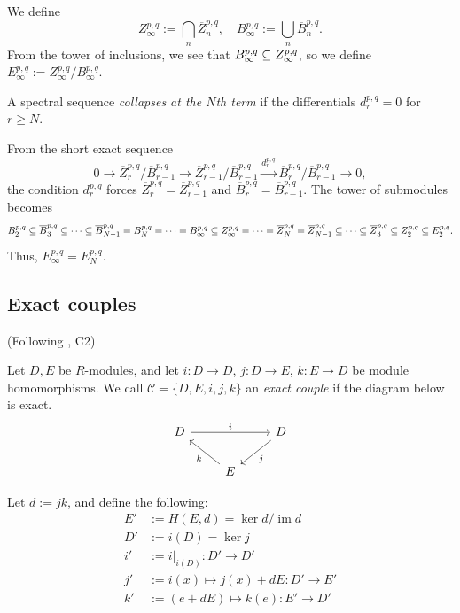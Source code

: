 \documentclass{MetricNotes2023}
\def\subq{\ensuremath\subseteq}
\DeclareMathOperator{\im}{im}
\begin{document}
We define 
\[Z_\infty^{p,q}:= \bigcap_n \overline{Z}^{p,q}_n, \quad B_\infty^{p,q}:=\bigcup_n \overline{B}^{p,q}_n.\]
From the tower of inclusions, we see that \(B_\infty^{p,q}\subq Z^{p,q}_\infty\), so we define \(E_\infty^{p,q}:=Z_\infty^{p,q}/B_\infty^{p,q}\). 

\begin{definition}
A spectral sequence \textit{collapses at the \(N\)th term} if the differentials \(d_r^{p,q}=0\) for \(r\geq N\). 
\end{definition}

From the short exact sequence 
\[0 \to \overline Z^{p,q}_{r}/\overline B_{r-1}^{p,q}\to \overline Z_{r-1}^{p,q}/\overline B_{r-1}^{p,q} \xrightarrow{d_{r}^{p,q}} \overline B_{r}^{p,q}/\overline{B}_{r-1}^{p,q}\to 0,\]
the condition \(d_r^{p,q}\) forces  \(\overline{Z}^{p,q}_r=\overline{Z}_{r-1}^{p,q}\) and \(\overline{B}^{p,q}_r=\overline{B}_{r-1}^{p,q}\). The tower of submodules becomes
\[B_2^{p,q}\subq \overline B_3^{p,q}\subq \cdots \subq \overline B_{N-1}^{p,q}=B_N^{p,q}= \cdots=B_\infty^{p,q} \subq Z_\infty^{p,q}= \cdots = \overline Z_N^{p,q}=\overline Z^{p,q}_{N-1}\subq \cdots \subq \overline Z_3^{p,q}\subq Z_2^{p,q}\subq E_2^{p,q}.\]
Thus, \(E_\infty^{p,q}=E_N^{p,q}\). 

\subsection{Exact couples}\label{2503301333}

(Following \autocite{spectral_sequences}, C2)

\begin{definition}
Let \(D, E\) be \(R\)-modules, and let \(i : D \to D\), \(j : D\to E\), \(k : E \to D\) be module homomorphisms. We call \(\mathcal{C}=\{D, E, i, j, k\}\) an \textit{exact couple} if the diagram below is exact.
\[\begin{tikzcd}
 D \arrow[rr, "i"] && D \arrow[dl, "j"] \\ 
  & E \arrow[ul, "k"] &  
 \end{tikzcd}\] 
\end{definition}

Let \(d:=jk\), and define the following:
\begin{align*}
E'&:=H(E, d)=\ker d/\im d\\
D'&:=i(D)=\ker j\\
i'&:=i|_{i(D)} : D'\to D'\\
j'&:=i(x)\mapsto j(x)+dE : D'\to E'\\
k'&:=(e+dE)\mapsto k(e) : E' \to D'
\end{align*}
\end{document}
